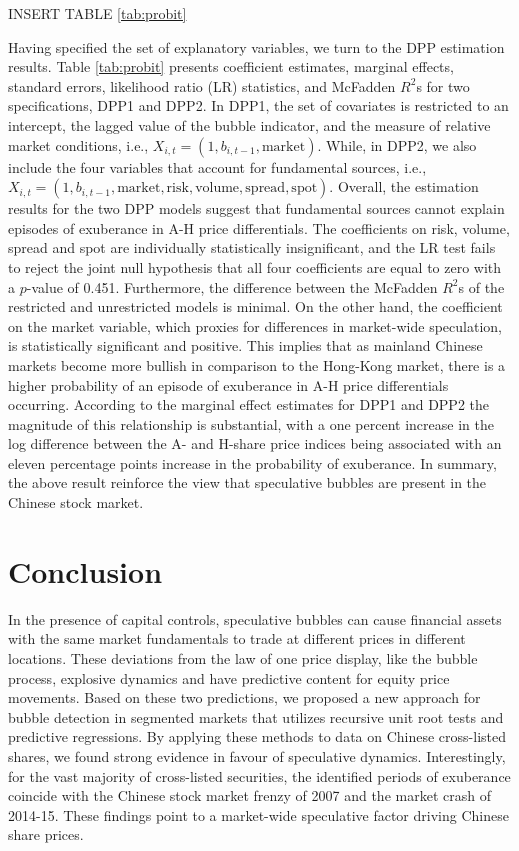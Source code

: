 \documentclass[11pt]{article}
\begin{document}
\begin{center}
INSERT TABLE \ref{tab:probit}
\end{center}

Having specified the set of explanatory variables, we turn to the DPP estimation results. Table \ref{tab:probit} presents coefficient estimates, marginal effects, standard errors, likelihood ratio (LR) statistics, and McFadden $R^2$s for two specifications, DPP1 and DPP2. In DPP1, the set of covariates is restricted to an intercept, the lagged value of the bubble indicator, and the measure of relative market conditions, i.e., $X_{i,t}=(1, b_{i,t-1}, \text{market})$. While, in DPP2, we also include the four variables that account for fundamental sources, i.e.,  $X_{i,t}=(1,b_{i,t-1}, \text{market}, \text{risk}, \text{volume} , \text{spread} , \text{spot})$. Overall, the estimation results for the two DPP models suggest that fundamental sources cannot explain  episodes of exuberance in A-H price differentials. The coefficients on risk, volume, spread and spot are individually statistically insignificant, and the LR test fails to reject the joint null hypothesis that all four coefficients are equal to zero with a $p$-value of 0.451. Furthermore, the difference between the McFadden $R^2$s of the restricted and unrestricted models is minimal. On the other hand, the coefficient on the market variable, which proxies for differences in market-wide speculation, is statistically significant and positive. This implies that as mainland Chinese markets become more bullish in comparison to the Hong-Kong market, there is a higher probability of an episode of exuberance in A-H price differentials occurring. According to the marginal effect estimates for DPP1 and DPP2 the magnitude of this relationship is substantial, with a one percent increase in the log difference between the A- and H-share price indices being associated with an eleven percentage points increase in the probability of exuberance. In summary, the above result reinforce the view that speculative bubbles are present in the Chinese stock market. 

\section{Conclusion}

In the presence of capital controls, speculative bubbles can cause financial assets with the same market fundamentals to trade at different prices in different locations. These deviations from the law of one price display, like the bubble process, explosive dynamics and have predictive content for equity price movements. Based on these two predictions, we proposed a new approach for bubble detection in segmented markets that utilizes recursive unit root tests and predictive regressions. By applying these methods to data on Chinese cross-listed shares, we found strong evidence in favour of speculative dynamics. Interestingly, for the vast majority of cross-listed securities, the identified periods of exuberance coincide with the Chinese stock market frenzy of 2007 and the market crash of 2014-15. These findings point to a market-wide speculative factor driving Chinese share prices.
\end{document}
